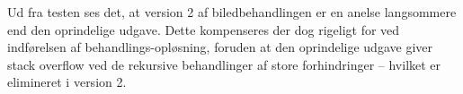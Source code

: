 Ud fra testen ses det, at version 2 af biledbehandlingen er en anelse langsommere end den oprindelige udgave. Dette kompenseres der dog rigeligt for ved indførelsen af behandlings-opløsning, foruden at den oprindelige udgave giver stack overflow ved de rekursive behandlinger af store forhindringer -- hvilket er elimineret i version 2.

\begin{comment}
	
Webcam
	Varetager forbindelse til webcam
	Henter BufferedImage i 320x240

Processor
	Billede ind som BufferedImage
	Parse til 2D-array
	Filtrering
	Optimering i walker
	Objekt-/robot ID
	Obstacle map
	Grafisk repræsentation
	Scaling (ej i brug)
	Returnerer Locations objekt til brug i pathfinder
	
Udviklingsproces
	Simpelt udgangspunkt
	Løbende tilføjet funktionalitet med behov fra stifinding
	Efter første full cycle udviklet i version 2 med optimeringer
	
Test
	Program t visuel test
	"Webcam-simulator"
	Benchmark kørsler, resultater
	Performance udvikling
\end{comment}